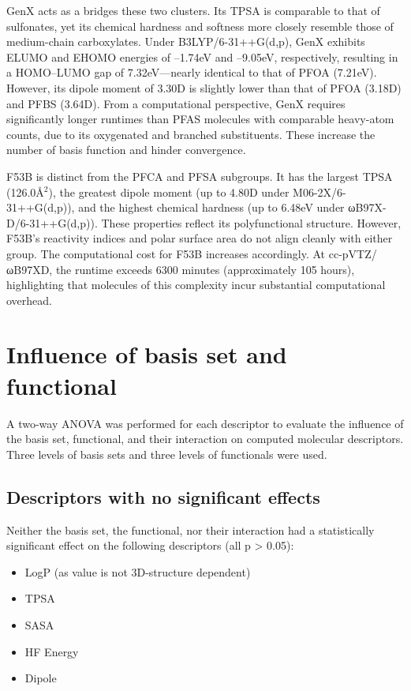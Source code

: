 GenX acts as a bridges these two clusters. Its TPSA is comparable to that of sulfonates, yet its chemical hardness and softness more closely resemble those of medium-chain carboxylates. Under B3LYP/6-31++G(d,p), GenX exhibits ELUMO and EHOMO energies of –1.74eV and –9.05eV, respectively, resulting in a HOMO–LUMO gap of 7.32eV—nearly identical to that of PFOA (7.21eV). However, its dipole moment of 3.30D is slightly lower than that of PFOA (3.18D) and PFBS (3.64D). From a computational perspective, GenX requires significantly longer runtimes than PFAS molecules with comparable heavy-atom counts, due to its oxygenated and branched substituents. These increase the number of basis function and hinder convergence.

F53B is distinct from the PFCA and PFSA subgroups. It has the largest TPSA (126.0Å$^2$), the greatest dipole moment (up to 4.80D under M06-2X/6-31++G(d,p)), and the highest chemical hardness (up to 6.48eV under ωB97X-D/6-31++G(d,p)). These properties reflect its polyfunctional structure. However, F53B’s reactivity indices and polar surface area do not align cleanly with either group. The computational cost for F53B increases accordingly. At cc-pVTZ/ωB97XD, the runtime exceeds 6300 minutes (approximately 105 hours), highlighting that molecules of this complexity incur substantial computational overhead.


\section{Influence of basis set and functional}

A two-way ANOVA was performed for each descriptor to evaluate the influence of the basis set, functional, and their interaction on computed molecular descriptors. Three levels of basis sets and three levels of functionals were used.

\clearpage
\subsection{Descriptors with no significant effects}

Neither the basis set, the functional, nor their interaction had a statistically significant effect on the following descriptors (all p > 0.05):

\begin{itemize}
    \item LogP (as value is not 3D-structure dependent)
    \item TPSA
    \item SASA
    \item HF Energy
    \item Dipole
\end{itemize}

